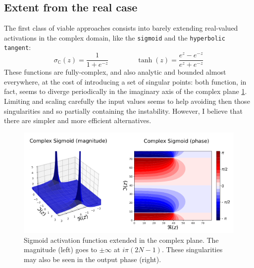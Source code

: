 \documentclass[../main.tex]{subfiles}
\begin{document}
\subsection*{Extent from the real case}
The first class of viable approaches consists into barely extending real-valued activations in the complex domain, like the \texttt{sigmoid} and the \texttt{hyperbolic tangent}:
\[ \sigma_\mathds{C}(z) = \frac{1}{1+e^{-z}}  \qquad\qquad \tanh(z) = \frac{e^z - e^{-z}}{e^z + e^{-z}} \]
These functions are fully-complex, and also analytic and bounded almost everywhere, at the cost of introducing a set of singular points: both function, in fact, seems to diverge periodically in the imaginary axis of the complex plane \ref{fig:cmplx_sigmoid}. Limiting and scaling carefully the input values seems to help avoiding then those singularities and so partially containing the instability. However, I believe that there are simpler and more efficient alternatives.
\begin{figure}[!ht]
	\centering
	\includegraphics[width=\textwidth]{pictures/cmplx_sigmoid}
	\caption{Sigmoid activation function extended in the complex plane. The magnitude (left) goes to $\pm\infty$ at $i\pi(2N-1)$. These singularities may also be seen in the output phase (right).}
	\label{fig:cmplx_sigmoid}
\end{figure}
\end{document}

